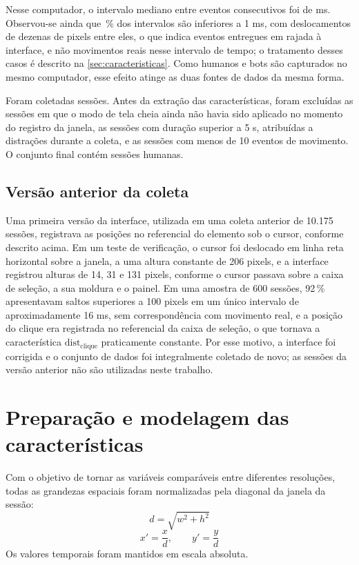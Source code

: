 Nesse computador, o intervalo mediano entre eventos consecutivos foi de  ms. Observou-se ainda que \,\% dos intervalos são inferiores a 1 ms, com deslocamentos de dezenas de pixels entre eles, o que indica eventos entregues em rajada à interface, e não movimentos reais nesse intervalo de tempo; o tratamento desses casos é descrito na \autoref{sec:caracteristicas}. Como humanos e bots são capturados no mesmo computador, esse efeito atinge as duas fontes de dados da mesma forma.

Foram coletadas  sessões. Antes da extração das características, foram excluídas as sessões em que o modo de tela cheia ainda não havia sido aplicado no momento do registro da janela, as sessões com duração superior a 5 s, atribuídas a distrações durante a coleta, e as sessões com menos de 10 eventos de movimento. O conjunto final contém  sessões humanas.

\subsection{Versão anterior da coleta}

Uma primeira versão da interface, utilizada em uma coleta anterior de 10.175 sessões, registrava as posições no referencial do elemento sob o cursor, conforme descrito acima. Em um teste de verificação, o cursor foi deslocado em linha reta horizontal sobre a janela, a uma altura constante de 206 pixels, e a interface registrou alturas de 14, 31 e 131 pixels, conforme o cursor passava sobre a caixa de seleção, a sua moldura e o painel. Em uma amostra de 600 sessões, 92\,\% apresentavam saltos superiores a 100 pixels em um único intervalo de aproximadamente 16 ms, sem correspondência com movimento real, e a posição do clique era registrada no referencial da caixa de seleção, o que tornava a característica $\text{dist}_{\text{clique}}$ praticamente constante. Por esse motivo, a interface foi corrigida e o conjunto de dados foi integralmente coletado de novo; as sessões da versão anterior não são utilizadas neste trabalho.

\section{Preparação e modelagem das características}
\label{sec:caracteristicas}

Com o objetivo de tornar as variáveis comparáveis entre diferentes resoluções, todas as grandezas espaciais foram normalizadas pela diagonal da janela da sessão:
\begin{equation}
    d = \sqrt{w^2 + h^2}
    \label{eq:diagonal}
\end{equation}
\begin{equation}
    x' = \frac{x}{d}, \qquad y' = \frac{y}{d}
    \label{eq:normalizacao}
\end{equation}
Os valores temporais foram mantidos em escala absoluta.

